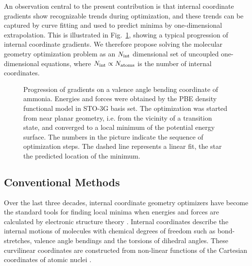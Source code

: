 \documentclass[prl,twocolumn,showpacs,twocolumngrid,superbib]{revtex4}
\begin{document}
An observation central to 
the present
contribution is that internal coordinate gradients show recognizable trends 
during optimization, and these trends can be captured by curve fitting and used to predict minima by 
one-dimensional extrapolation.  This is illustrated in Fig.~\ref{NH3outp6}, showing a typical progression of 
internal coordinate gradients.  We therefore propose solving the molecular geometry optimization problem as 
an $N_{\rm int}$ 
dimensional
set of uncoupled one-dimensional equations, where $N_{\rm int} \propto N_{\rm atoms}$ is 
the number of internal coordinates. 

\begin{figure}[h]
\caption{
Progression of gradients on a valence angle bending coordinate of
ammonia. Energies and forces were obtained by the PBE 
density functional model in STO-3G basis set.
The optimization was started from near planar geometry, i.e.
from the vicinity of a transition state, and converged to a local 
minimum of the potential energy surface. The numbers in the picture
indicate the sequence of optimization steps. The dashed line represents
a linear fit, the star the predicted location of the minimum.}
\label{NH3outp6}
\end{figure}

\subsection{Conventional Methods}

Over the last three decades, internal coordinate geometry optimizers have become the standard 
tools for 
finding
local minima when energies and forces are calculated by electronic structure 
theory \cite{10papers}. Internal coordinates describe the internal motions of molecules 
with chemical degrees of freedom such as bond-stretches, valence angle bendings and the torsions 
of dihedral angles. These curvilinear coordinates are constructed from non-linear functions of the 
Cartesian coordinates of atomic nuclei \cite{wilson}.
\end{document}
